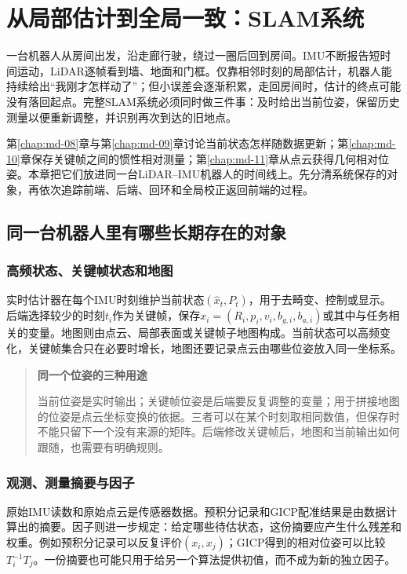 \chapter{从局部估计到全局一致：SLAM系统}

\label{chap:md-12}

一台机器人从房间出发，沿走廊行驶，绕过一圈后回到房间。IMU不断报告短时间运动，LiDAR逐帧看到墙、地面和门框。仅靠相邻时刻的局部估计，机器人能持续给出“我刚才怎样动了”；但小误差会逐渐积累，走回房间时，估计的终点可能没有落回起点。完整SLAM系统必须同时做三件事：及时给出当前位姿，保留历史测量以便重新调整，并识别再次到达的旧地点。

第\ref{chap:md-08}章与第\ref{chap:md-09}章讨论当前状态怎样随数据更新；第\ref{chap:md-10}章保存关键帧之间的惯性相对测量；第\ref{chap:md-11}章从点云获得几何相对位姿。本章把它们放进同一台LiDAR–IMU机器人的时间线上。先分清系统保存的对象，再依次追踪前端、后端、回环和全局校正返回前端的过程。

\section{同一台机器人里有哪些长期存在的对象}

\subsection{高频状态、关键帧状态和地图}

实时估计器在每个IMU时刻维护当前状态$(\hat x_t,P_t)$，用于去畸变、控制或显示。后端选择较少的时刻$t_i$作为关键帧，保存$x_i=(R_i,p_i,v_i,b_{g,i},b_{a,i})$或其中与任务相关的变量。地图则由点云、局部表面或关键帧子地图构成。当前状态可以高频变化，关键帧集合只在必要时增长，地图还要记录点云由哪些位姿放入同一坐标系。

\begin{quote}\textbf{同一个位姿的三种用途}\par

当前位姿是实时输出；关键帧位姿是后端要反复调整的变量；用于拼接地图的位姿是点云坐标变换的依据。三者可以在某个时刻取相同数值，但保存时不能只留下一个没有来源的矩阵。后端修改关键帧后，地图和当前输出如何跟随，也需要有明确规则。

\end{quote}

\subsection{观测、测量摘要与因子}

原始IMU读数和原始点云是传感器数据。预积分记录和GICP配准结果是由数据计算出的摘要。因子则进一步规定：给定哪些待估状态，这份摘要应产生什么残差和权重。例如预积分记录可以反复评价$(x_i,x_j)$；GICP得到的相对位姿可以比较$T_i^{-1}T_j$。一份摘要也可能只用于给另一个算法提供初值，而不成为新的独立因子。

